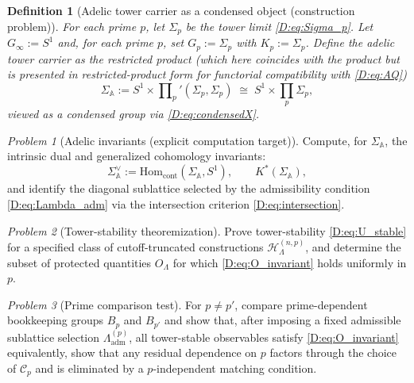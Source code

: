 \documentclass[11pt]{article}
\newtheorem{definition}[theorem]{Definition}
\theoremstyle{remark}
\newtheorem{problem}{Problem}
\begin{document}
{\begin{definition}[Adelic tower carrier as a condensed object (construction problem)]\label{D:def:adelic_carrier}
For each prime $p$, let $\Sigma_{p}$ be the tower limit \eqref{D:eq:Sigma_p}.
Let $G_{\infty}:=S^{1}$ and, for each prime $p$, set $G_{p}:=\Sigma_{p}$ with $K_{p}:=\Sigma_{p}$.
Define the adelic tower carrier as the restricted product (which here coincides with the product but is presented in restricted-product form for functorial compatibility with \eqref{D:eq:AQ})
\begin{equation}
\Sigma_{\mathbb A}:=S^{1}\times \prod\nolimits_{p}'(\Sigma_{p},\Sigma_{p})
\;\cong\;
S^{1}\times \prod_{p}\Sigma_{p},
\label{D:eq:SigmaA}
\end{equation}
viewed as a condensed group via \eqref{D:eq:condensedX}.
\end{definition}

\begin{problem}[Adelic invariants (explicit computation target)]\label{D:prob:adelic_invariants}
Compute, for $\Sigma_{\mathbb A}$, the intrinsic dual and generalized cohomology invariants:
\begin{equation}
\Sigma_{\mathbb A}^{\vee}:=\mathrm{Hom}_{\mathrm{cont}}(\Sigma_{\mathbb A},S^{1}),
\qquad
K^{\ast}(\Sigma_{\mathbb A}),
\label{D:eq:SigmaA_targets}
\end{equation}
and identify the diagonal sublattice selected by the admissibility condition \eqref{D:eq:Lambda_adm} via the intersection criterion \eqref{D:eq:intersection}.
\end{problem} 
\begin{problem}[Tower-stability theoremization]\label{D:prob:stability}
Prove tower-stability \eqref{D:eq:U_stable} for a specified class of cutoff-truncated constructions $\mathcal H_{\Lambda}^{(n,p)}$, and determine the subset of protected quantities $O_{\Lambda}$ for which \eqref{D:eq:O_invariant} holds uniformly in $p$.
\end{problem}

\begin{problem}[Prime comparison test]\label{D:prob:prime_comparison}
For $p\neq p'$, compare prime-dependent bookkeeping groups $B_{p}$ and $B_{p'}$ and show that, after imposing a fixed admissible sublattice selection $\Lambda_{\mathrm{adm}}^{(p)}$, all tower-stable observables satisfy \eqref{D:eq:O_invariant} equivalently, show that any residual dependence on $p$ factors through the choice of $\mathcal C_{p}$ and is eliminated by a $p$-independent matching condition.
\end{problem}

}
\end{document}
